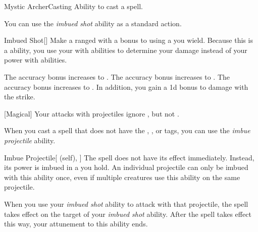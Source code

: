     \begin{feat}{Mystic Archer}{Casting}
        \featpre Ability to cast a spell.

         You can use the \textit{imbued shot} ability as a standard action.
        \begin{freeability}{Imbued Shot}[]
            Make a ranged  with a  bonus to  using a  you wield.
            Because this is a  ability, you use your  with  abilities to determine your damage instead of your power with  abilities.

            \rankline
             The accuracy bonus increases to .
             The accuracy bonus increases to .
             The accuracy bonus increases to .
                In addition, you gain a \plus1d bonus to damage with the strike.
        \end{freeability}

        [Magical] Your attacks with projectiles ignore , but not .

         When you cast a spell that does not have the , , or  tags,
            you can use the \textit{imbue projectile} ability.
        \begin{attuneability}{Imbue Projectile}[ (self), ]
            The spell does not have its effect immediately.
            Instead, its power is imbued in a  you hold.
            An individual projectile can only be imbued with this ability once, even if multiple creatures use this ability on the same projectile.

            When you use your \textit{imbued shot} ability to attack with that projectile, the spell takes effect on the target of your \textit{imbued shot} ability.
            After the spell takes effect this way, your attunement to this ability ends.
        \end{attuneability}



\end{feat}
